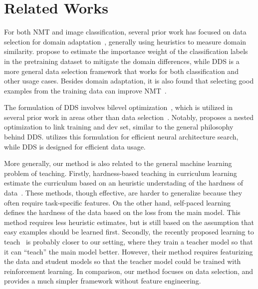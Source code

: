 \section{\label{sec:related_work}Related Works}

For both NMT and image classification, several prior work has focused on data selection for domain adaptation~\citep{moore2010intelligent,axelrod2011domain,domain_adapt_transfer,jiang-zhai-2007-instance,foster-etal-2010-discriminative,wang-etal-2017-instance}, generally using heuristics to measure domain similarity. \cite{domain_adapt_transfer} propose to estimate the importance weight of the classification labels in the pretraining dataset to mitigate the domain differences, while DDS is a more general data selection framework that works for both classification and other usage cases. Besides domain adaptation, it is also found that selecting good examples from the training data can improve NMT~\citep{vyas-etal-2018-identifying,pham-etal-2018-fixing}.  

The formulation of DDS involves bilevel optimization~\citep{bilevel_optim,hier_optim}, which is utilized in several prior work in areas other than data selection~\citep{darts,hyper_grad,finn2017model}. Notably, \cite{darts} proposes a nested optimization to link training and dev set, similar to the general philosophy behind DDS. \cite{darts} utilizes this formulation for efficient neural architecture search, while DDS is designed for efficient data usage.

More generally, our method is also related to the general machine learning problem of teaching. Firstly, hardness-based teaching in curriculum learning estimate the curriculum based on an heuristic understading of the hardness of data~\citep{cl_bengio,automate_cl_GravesBMMK17,SpitkovskyAJ10,zhang2016boosting,zhang2018empirical,platanios19naacl,baysian_curriculum}. These methods, though effective, are harder to generalize because they often require task-specific features. On the other hand, self-paced learning~\citep{spl_visual_category,spl_kumar,spl_visual_category} defines the hardness of the data based on the loss from the main model. This method requires less heuristic estimates, but is still based on the assumption that easy examples should be learned first. Secondly, the recently proposed learning to teach~\citep{learn_to_teach} is probably closer to our setting, where they train a teacher model so that it can ``teach'' the main model better. However, their method requires featurizing the data and student models so that the teacher model could be trained with reinforcement learning. In comparison, our method focuses on data selection, and provides a much simpler framework without feature engineering. 

